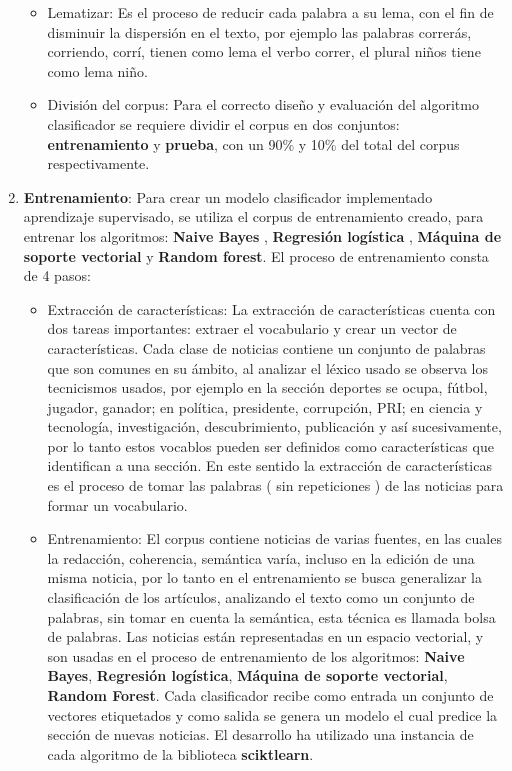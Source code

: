 \begin{enumerate}
\begin{itemize}
    \item Lematizar: Es el proceso de reducir cada palabra a su lema, con el fin de disminuir la dispersión en el texto, por ejemplo las palabras correrás, corriendo, corrí, tienen como lema el verbo correr, el plural niños tiene como lema niño.\\
    
    \item División del corpus: Para el correcto diseño y evaluación del algoritmo clasificador se requiere dividir el corpus en dos conjuntos: \textbf{entrenamiento} y \textbf{prueba}, con un 90\% y 10\% del total del corpus respectivamente.\\
  \end{itemize}

  \item \textbf{Entrenamiento}: Para crear un modelo clasificador implementado aprendizaje supervisado, se utiliza el corpus de entrenamiento creado, para entrenar los algoritmos: \textbf{Naive Bayes} , \textbf{Regresión logística} , \textbf{Máquina de soporte vectorial} y \textbf{Random forest}. El proceso de entrenamiento consta de 4 pasos:\\

  \begin{itemize}

    \item Extracción de características: La extracción de características cuenta con dos tareas importantes: extraer el vocabulario y crear un vector de características. Cada clase de noticias contiene un conjunto de palabras que son comunes en su ámbito, al analizar el léxico usado se observa los tecnicismos usados, por ejemplo en la sección deportes se ocupa, fútbol, jugador, ganador; en política, presidente, corrupción, PRI; en ciencia y tecnología, investigación, descubrimiento, publicación y así sucesivamente, por lo tanto estos vocablos pueden ser definidos como características que identifican a una sección. En este sentido la extracción de características es el proceso de tomar las palabras ( sin repeticiones ) de las noticias para formar un vocabulario.\\

    \item Entrenamiento: El corpus contiene noticias de varias fuentes, en  las cuales la redacción, coherencia, semántica varía, incluso en la edición de una misma noticia, por lo tanto en el entrenamiento se busca generalizar la clasificación de los artículos, analizando el texto como un conjunto de palabras, sin tomar en cuenta la semántica, esta técnica es llamada bolsa de palabras. Las noticias están representadas en un espacio vectorial, y son usadas en el proceso de entrenamiento de los algoritmos: \textbf{Naive Bayes}, \textbf{Regresión logística}, \textbf{Máquina de soporte vectorial}, \textbf{Random Forest}. Cada clasificador recibe como entrada un conjunto de vectores etiquetados y como salida se genera un modelo el cual predice la sección de nuevas noticias. El desarrollo ha utilizado una instancia de cada algoritmo de la biblioteca \textbf{sciktlearn}.\\


\end{itemize}
\end{enumerate}
